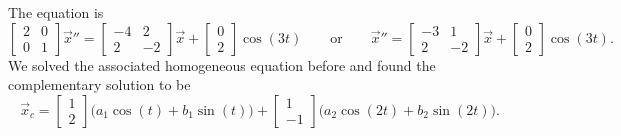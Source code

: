 \documentclass{ximera}
\begin{document}
\begin{exampleSol}
    The equation is
    \begin{equation*}
        \begin{bmatrix}
            2 & 0 \\
            0 & 1
        \end{bmatrix}
        {\vec{x}}'' =
        \begin{bmatrix}
            -4 & 2 \\
            2 & -2
        \end{bmatrix}
        \vec{x} + 
        \begin{bmatrix}
            0 \\ 
            2
        \end{bmatrix}
            \cos (3 t) \qquad \text{or} \qquad
            {\vec{x}}'' =
        \begin{bmatrix}
            -3 & 1 \\
            2 & -2
        \end{bmatrix}
        \vec{x} + 
        \begin{bmatrix}
            0 \\ 
            2
        \end{bmatrix}
        \cos (3 t) .
    \end{equation*}
    We solved the associated homogeneous equation before and found the complementary solution to be
    \begin{equation*}
        \vec{x}_c =
        \begin{bmatrix} 
            1 \\ 
            2 
        \end{bmatrix}
        \bigl( a_1 \cos (t) + b_1 \sin (t) \bigr) +
        \begin{bmatrix} 
            1 \\ 
            -1 
        \end{bmatrix}
        \bigl( a_2 \cos (2t) + b_2 \sin (2t) \bigr) .
    \end{equation*}
    

\end{exampleSol}
\end{document}
